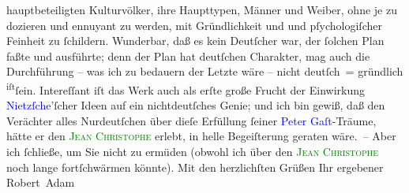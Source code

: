                hauptbeteiligten Kulturvölker, ihre Haupttypen, Männer und Weiber, ohne je zu
               dozieren und ennuyant zu werden, mit Gründlichkeit und und pſychologiſcher Feinheit
                   zu ſchildern. Wunderbar, daß es kein Deutſcher
               war, der ſolchen Plan faßte und ausführte; denn der Plan hat deutſchen Charakter, mag
               auch die Durchführung – was ich zu bedauern {\pb}der
               Letzte wäre – nicht deutſch = gründlich \substVorne{}\textsuperscript{iſt}\substDazwischen{}ſein\substHinten{}. Intereſſant iſt das Werk auch als erſte große Frucht der Einwirkung \textcolor{blue}{Nietzſche}{}\ledrightnote{\textcolor{blue}{Friedrich Nietzsche}}’ſcher Ideen auf ein nichtdeutſches
               Genie; und ich bin gewiß, daß den Verächter alles Nurdeutſchen über dieſe Erfüllung
               ſeiner \textcolor{blue}{Peter Gaſt}{}\ledrightnote{\textcolor{blue}{Peter Gast}}-Träume, hätte er den \textcolor{green}{\textsc{Jean Christophe}}{}\ledrightnote{\textcolor{green}{Jean Christophe}} erlebt, in helle Begeiſterung geraten wäre. –\pend
           \pstart
           Aber ich ſchließe, um Sie nicht zu ermüden (obwohl ich über den \textcolor{green}{\textsc{Jean Christophe}}{}\ledrightnote{\textcolor{green}{Jean Christophe}} noch lange fortſchwärmen könnte).\pend
           \pstart
           Mit den herzlichſten Grüßen Ihr ergebener\pend
           \pstart \spacefill\mbox{Robert Adam}\pend{}\endnumbering{}  
      